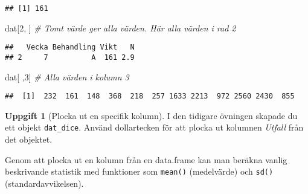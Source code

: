 \documentclass[
]{book}
\newenvironment{Shaded}{\begin{snugshade}}{\end{snugshade}}
\newcommand{\CommentTok}[1]{\textcolor[rgb]{0.56,0.35,0.01}{\textit{#1}}}
\newcommand{\DecValTok}[1]{\textcolor[rgb]{0.00,0.00,0.81}{#1}}
\newcommand{\FunctionTok}[1]{\textcolor[rgb]{0.13,0.29,0.53}{\textbf{#1}}}
\newcommand{\NormalTok}[1]{#1}
\newcommand{\SpecialCharTok}[1]{\textcolor[rgb]{0.81,0.36,0.00}{\textbf{#1}}}
\theoremstyle{definition}
\theoremstyle{definition}
\theoremstyle{definition}
\newtheorem{exercise}{Uppgift}[chapter]
\theoremstyle{definition}
\theoremstyle{remark}
\begin{document}
\begin{verbatim}
## [1] 161
\end{verbatim}

\begin{Shaded}
\begin{Highlighting}[]
\NormalTok{dat[}\DecValTok{2}\NormalTok{, ]          }\CommentTok{\# Tomt värde ger alla värden. Här alla värden i rad 2}
\end{Highlighting}
\end{Shaded}

\begin{verbatim}
##   Vecka Behandling Vikt   N
## 2     7          A  161 2.9
\end{verbatim}

\begin{Shaded}
\begin{Highlighting}[]
\NormalTok{dat[ ,}\DecValTok{3}\NormalTok{]          }\CommentTok{\# Alla värden i kolumn 3}
\end{Highlighting}
\end{Shaded}

\begin{verbatim}
##  [1]  232  161  148  368  218  257 1633 2213  972 2560 2430  855
\end{verbatim}

\begin{exercise}[Plocka ut en specifik kolumn]

I den tidigare övningen skapade du ett objekt \texttt{dat\_dice}. Använd dollartecken för att plocka ut kolumnen \emph{Utfall} från det objektet.

\begin{Shaded}
\end{Shaded}

\end{exercise}

Genom att plocka ut en kolumn från en data.frame kan man beräkna vanlig beskrivande statistik med funktioner som \texttt{mean()} (medelvärde) och \texttt{sd()} (standardavvikelsen).

\begin{Shaded}
\end{Shaded}
\end{document}
